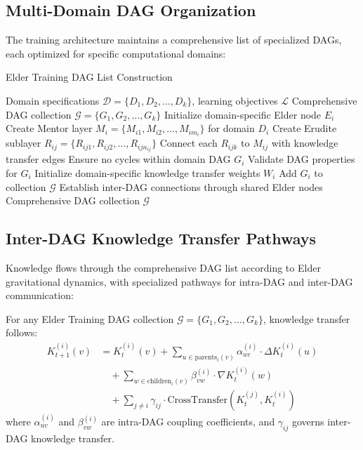 \subsection{Multi-Domain DAG Organization}

The training architecture maintains a comprehensive list of specialized DAGs, each optimized for specific computational domains:

\begin{algorithm}[H]
\caption{Elder Training DAG List Construction}
\begin{algorithmic}[1]
\REQUIRE Domain specifications $\mathcal{D} = \{D_1, D_2, \ldots, D_k\}$, learning objectives $\mathcal{L}$
\ENSURE Comprehensive DAG collection $\mathcal{G} = \{G_1, G_2, \ldots, G_k\}$
    \STATE Initialize domain-specific Elder node $E_i$
    \STATE Create Mentor layer $M_i = \{M_{i1}, M_{i2}, \ldots, M_{im_i}\}$ for domain $D_i$
        \STATE Create Erudite sublayer $R_{ij} = \{R_{ij1}, R_{ij2}, \ldots, R_{ijn_{ij}}\}$
        \STATE Connect each $R_{ijk}$ to $M_{ij}$ with knowledge transfer edges
        \STATE Ensure no cycles within domain DAG $G_i$
    \ENDFOR
    \STATE Validate DAG properties for $G_i$
    \STATE Initialize domain-specific knowledge transfer weights $W_i$
    \STATE Add $G_i$ to collection $\mathcal{G}$
\ENDFOR
\STATE Establish inter-DAG connections through shared Elder nodes
\RETURN Comprehensive DAG collection $\mathcal{G}$
\end{algorithmic}
\end{algorithm}

\subsection{Inter-DAG Knowledge Transfer Pathways}

Knowledge flows through the comprehensive DAG list according to Elder gravitational dynamics, with specialized pathways for intra-DAG and inter-DAG communication:

\begin{theorem}
For any Elder Training DAG collection $\mathcal{G} = \{G_1, G_2, \ldots, G_k\}$, knowledge transfer follows:
\begin{align}
K_{t+1}^{(i)}(v) &= K_t^{(i)}(v) + \sum_{u \in \text{parents}_i(v)} \alpha_{uv}^{(i)} \cdot \Delta K_t^{(i)}(u) \\
&\quad + \sum_{w \in \text{children}_i(v)} \beta_{vw}^{(i)} \cdot \nabla K_t^{(i)}(w) \\
&\quad + \sum_{j \neq i} \gamma_{ij} \cdot \text{CrossTransfer}(K_t^{(j)}, K_t^{(i)})
\end{align}
where $\alpha_{uv}^{(i)}$ and $\beta_{vw}^{(i)}$ are intra-DAG coupling coefficients, and $\gamma_{ij}$ governs inter-DAG knowledge transfer.
\end{theorem}

